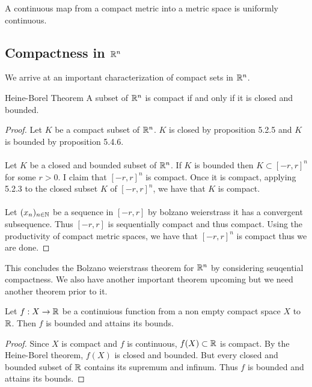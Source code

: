 \documentclass[a4paper]{article}
\begin{document}
\begin{thm}{}{} A continuous map from a compact metric into a metric space is uniformly continuous. 
\end{thm}

\subsection{Compactness in $\mathbb{R}^n$}
We arrive at an important characterization of compact sets in $\mathbb{R}^n$. 
\begin{thm}{Heine-Borel Theorem}{} A subset of $\mathbb{R}^n$ is compact if and only if it is closed and bounded. \tcbline
\begin{proof}
Let $K$ be a compact subset of $\mathbb{R}^n$. $K$ is closed by proposition 5.2.5 and $K$ is bounded by proposition 5.4.6. \\~\\
Let $K$ be a closed and bounded subset of $\mathbb{R}^n$. If $K$ is bounded then $K\subset[-r,r]^n$ for some $r>0$. I claim that $[-r,r]^n$ is compact. Once it is compact, applying 5.2.3 to the closed subset $K$ of $[-r,r]^n$, we have that $K$ is compact. \\~\\
Let $(x_n)_{n\in\mathbb{N}}$ be a sequence in $[-r,r]$ by bolzano weierstrass it has a convergent subsequence. Thus $[-r,r]$ is sequentially compact and thus compact. Using the productivity of compact metric spaces, we have that $[-r,r]^n$ is compact thus we are done. 
\end{proof}
\end{thm}

This concludes the Bolzano weierstrass theorem for $\mathbb{R}^n$ by considering seuqential compactness. We also have another important theorem upcoming but we need another theorem prior to it. 

\begin{thm}{}{} Let $f:X\to\mathbb{R}$ be a continuious function from a non empty compact space $X$ to $\mathbb{R}$. Then $f$ is bounded and attains its bounds. \tcbline
\begin{proof}
Since $X$ is compact and $f$ is continuous, $f(X)\subset\mathbb{R}$ is compact. By the Heine-Borel theorem, $f(X)$ is closed and bounded. But every closed and bounded subset of $\mathbb{R}$ contains its supremum and infinum. Thus $f$ is bounded and attains its bounds. 
\end{proof}
\end{thm}
\end{document}
